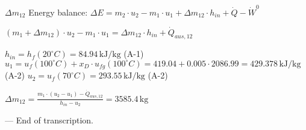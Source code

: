 \( \Delta m_{12} \)  
Energy balance:  
\( \Delta E = m_{2} \cdot u_{2} - m_{1} \cdot u_{1} + \Delta m_{12} \cdot h_{in} + \dot{Q} - \dot{W}^0 \)  

\( (m_{1} + \Delta m_{12}) \cdot u_{2} - m_{1} \cdot u_{1} = \Delta m_{12} \cdot h_{in} + \dot{Q}_{aus,12} \)  

\( h_{in} = h_{f}(20^\circ C) = 84.94 \, \text{kJ/kg} \) (A-1)  
\( u_{1} = u_{f}(100^\circ C) + x_D \cdot u_{fg}(100^\circ C) = 419.04 + 0.005 \cdot 2086.99 = 429.378 \, \text{kJ/kg} \) (A-2)  
\( u_{2} = u_{f}(70^\circ C) = 293.55 \, \text{kJ/kg} \) (A-2)  

\( \Delta m_{12} = \frac{m_{1} \cdot (u_{2} - u_{1}) - \dot{Q}_{aus,12}}{h_{in} - u_{2}} = 3585.4 \, \text{kg} \)  

---  
End of transcription.